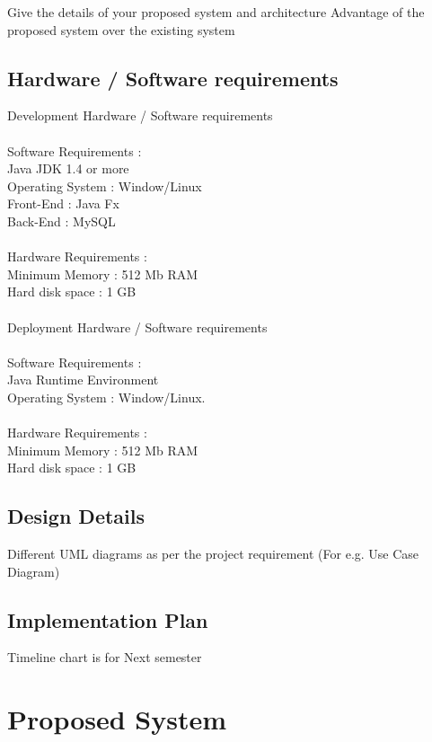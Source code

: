 Give the details of your proposed system and architecture 
Advantage of the proposed system over the existing system

\subsection{Hardware / Software requirements}
Development Hardware / Software requirements \\\\
Software Requirements : \\
Java  JDK 1.4 or more \\
Operating System : Window/Linux\\
Front-End : Java Fx\\
Back-End : MySQL\\\\
Hardware Requirements :\\
Minimum Memory : 512 Mb RAM \\
Hard disk space : 1 GB\\\\
Deployment Hardware / Software requirements \\\\
Software Requirements : \\
Java Runtime Environment\\
Operating System : Window/Linux. \\\\
Hardware Requirements : \\
Minimum Memory : 512 Mb RAM \\
Hard disk space : 1 GB\\

\subsection{Design Details}

Different UML diagrams as per the project requirement (For e.g. Use Case Diagram)

\subsection{Implementation Plan}

Timeline chart is for Next semester 





\section{Proposed System}

